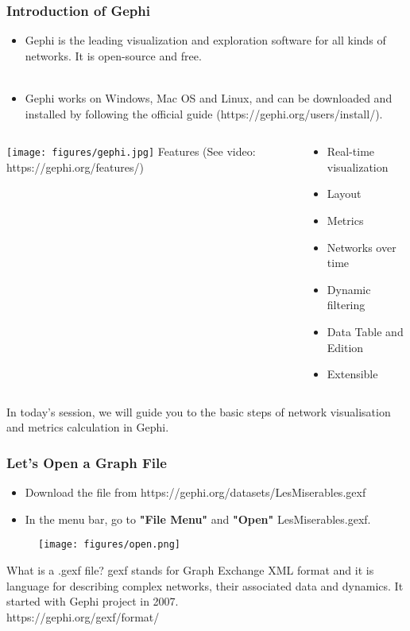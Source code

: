 \documentclass[10pt]{beamer}
\begin{document}
\begin{frame}
\frametitle{Introduction of Gephi}
\begin{itemize}
\item Gephi is the leading visualization and exploration software for all kinds of networks. It is open-source and free. \\~\\
\item Gephi works on Windows, Mac OS and Linux, and can be downloaded and installed by following the official guide (https://gephi.org/users/install/).
\end{itemize}
\begin{columns}
\centering
\texttt{[image: figures/gephi.jpg]}
Features (See video: https://gephi.org/features/)
\begin{multicols}{3}
\begin{itemize}
\item Real-time visualization
\item Layout
\item Metrics
\item Networks over time
\item Dynamic filtering
\item Data Table and Edition
\item Extensible
\end{itemize}
\end{multicols}
\end{columns} 
\end{frame}

\begin{frame}
In today's session, we will guide you to the basic steps of network \alert{visualisation} and \alert{metrics calculation} in Gephi.
\end{frame}


\begin{frame}
\frametitle{Let's Open a Graph File}
\begin{itemize}
\item Download the file from https://gephi.org/datasets/LesMiserables.gexf
\item In the menu bar, go to \textbf{"File Menu"} and \textbf{"Open"} LesMiserables.gexf.
\end{itemize}

\begin{figure}
\texttt{[image: figures/open.png]}
\end{figure}

What is a .gexf file? gexf stands for Graph Exchange XML format and it is language for describing complex networks, their associated data and dynamics. It started with Gephi project in 2007. \\
https://gephi.org/gexf/format/ 
\end{frame}
\end{document}
